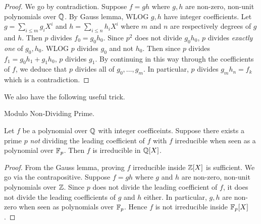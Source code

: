 \documentclass[../book.tex]{subfiles}
\begin{document}
\begin{proof}
    
    We go by contradiction. 
    Suppose $f = gh$ where $g, h$ are non-zero, non-unit polynomials over $\mathbb{Q}$. 
    By Gauss lemma, WLOG $g, h$ have integer coefficients. 
    Let $g = \sum_{i \leq m} g_i X^i$ and $h = \sum_{i \leq n} h_i X^i$
    where $m$ and $n$ are respectively degrees of $g$ and $h$. 
    Then $p$ divides $f_0 = g_0 h_0$. 
    Since $p^2$ does not divide $g_0 h_0$, 
    $p$ divides \emph{exactly one} of $g_0, h_0$.
    WLOG $p$ divides $g_0$ and not $h_0$. 
    Then since $p$ divides $f_1 = g_0 h_1 + g_1 h_0$, $p$ divides $g_1$.
    By continuing in this way through the coefficients of $f$,
    we deduce that $p$ divides all of $g_0, \dots, g_m$. 
    In particular, $p$ divides $g_m h_n = f_k$ which is a contradiction. 
    
\end{proof}

We also have the following useful trick. 

\begin{thm} Modulo Non-Dividing Prime. 
    
    Let $f$ be a polynomial over $\mathbb{Q}$ with integer coefficeints. 
    Suppose there exists a prime $p$ 
    \emph{not} dividing the leading coefficient of $f$
    with $f$ irreducible when seen as a polynomial over $\mathbb{F}_p$. 
    Then $f$ is irreducible in $\mathbb{Q}[X]$. 
    
\end{thm}
\begin{proof}
    
    From the Gauss lemma, proving $f$ irreducible inside $\mathbb{Z}[X]$ is sufficient. 
    We go via the contrapositive. 
    Suppose $f = gh$ where $g$ and $h$ are non-zero, non-unit polynomials over $\mathbb{Z}$. 
    Since $p$ does not divide the leading coefficient of $f$,
    it does not divide the leading coefficients of $g$ and $h$ either. 
    In particular, $g, h$ are non-zero when seen as polynomials over $\mathbb{F}_p$. 
    Hence $f$ is not irreducible inside $\mathbb{F}_p[X]$.
    
\end{proof}

\end{document}
